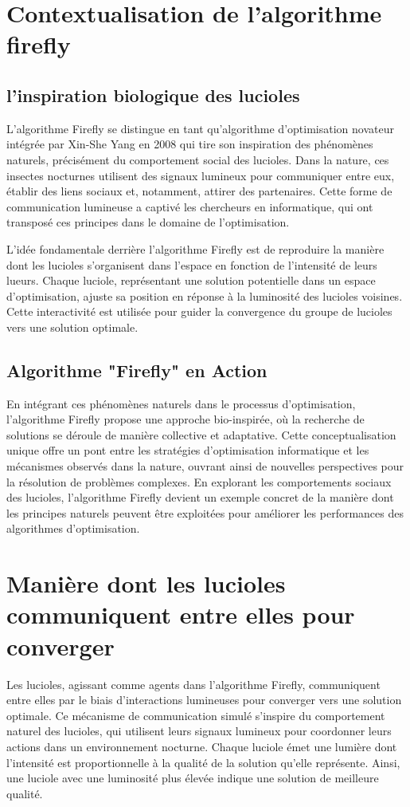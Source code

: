 \documentclass[conference]{IEEEtran}
\begin{document}
\section{Contextualisation de l'algorithme firefly}

\subsection{l'inspiration biologique des lucioles}


L'algorithme Firefly se distingue en tant qu'algorithme d'optimisation novateur intégrée par Xin-She Yang en 2008 qui tire son inspiration des phénomènes naturels, précisément du comportement social des lucioles. Dans la nature, ces insectes nocturnes utilisent des signaux lumineux pour communiquer entre eux, établir des liens sociaux et, notamment, attirer des partenaires. Cette forme de communication lumineuse a captivé les chercheurs en informatique, qui ont transposé ces principes dans le domaine de l'optimisation.

L'idée fondamentale derrière l'algorithme Firefly est de reproduire la manière dont les lucioles s'organisent dans l'espace en fonction de l'intensité de leurs lueurs. Chaque luciole, représentant une solution potentielle dans un espace d'optimisation, ajuste sa position en réponse à la luminosité des lucioles voisines. Cette interactivité est utilisée pour guider la convergence du groupe de lucioles vers une solution optimale.



\subsection{Algorithme "Firefly" en Action}

En intégrant ces phénomènes naturels dans le processus d'optimisation, l'algorithme Firefly propose une approche bio-inspirée, où la recherche de solutions se déroule de manière collective et adaptative. Cette conceptualisation unique offre un pont entre les stratégies d'optimisation informatique et les mécanismes observés dans la nature, ouvrant ainsi de nouvelles perspectives pour la résolution de problèmes complexes. En explorant les comportements sociaux des lucioles, l'algorithme Firefly devient un exemple concret de la manière dont les principes naturels peuvent être exploitées pour améliorer les performances des algorithmes d'optimisation.

\section{Manière dont les lucioles communiquent entre elles pour converger}
Les lucioles, agissant comme agents dans l'algorithme Firefly, communiquent entre elles par le biais d'interactions lumineuses pour converger vers une solution optimale. Ce mécanisme de communication simulé s'inspire du comportement naturel des lucioles, qui utilisent leurs signaux lumineux pour coordonner leurs actions dans un environnement nocturne. Chaque luciole émet une lumière dont l'intensité est proportionnelle à la qualité de la solution qu'elle représente. Ainsi, une luciole avec une luminosité plus élevée indique une solution de meilleure qualité.
\end{document}
